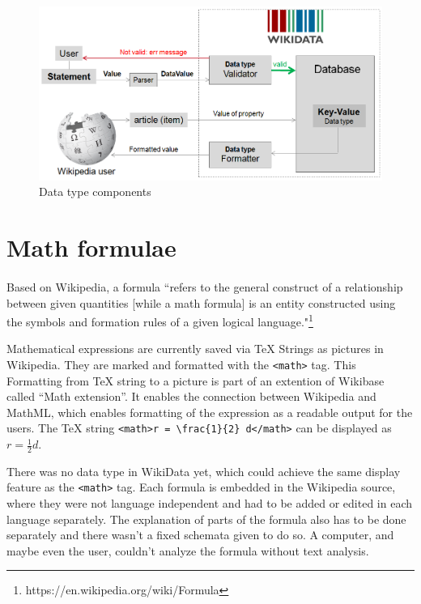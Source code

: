 \documentclass[12pt]{article}
\begin{document}
\begin{figure}[h]
\includegraphics[width=\textwidth]{Pic4}
\caption{Data type components}
\label{pic4}
\end{figure}

\section{Math formulae}
\paragraph{}
Based on Wikipedia, a formula \textquotedblleft refers to the general construct of a relationship between given quantities [while a math formula] is an entity constructed using the symbols and formation rules of a given logical language."\footnote{https://en.wikipedia.org/wiki/Formula}

Mathematical expressions are currently saved via TeX Strings as pictures in Wikipedia. They are marked and formatted with the \verb|<math>| tag. This Formatting from TeX string to a picture is part of an extention of Wikibase called “Math extension”. It enables the connection between Wikipedia and MathML, which enables formatting of the expression as a readable output for the users. The TeX string \verb|<math>r = \frac{1}{2} d</math>| can be displayed as $r = \frac{1}{2} d$. 

There was no data type in WikiData yet, which could achieve the same display feature as the \verb|<math>| tag. Each formula is embedded in the Wikipedia source, where they were not language independent and had to be added or edited in each language separately. The explanation of parts of the formula also has to be done separately and there wasn't a fixed schemata given to do so. A computer, and maybe even the user, couldn't analyze the formula without text analysis.
\end{document}
